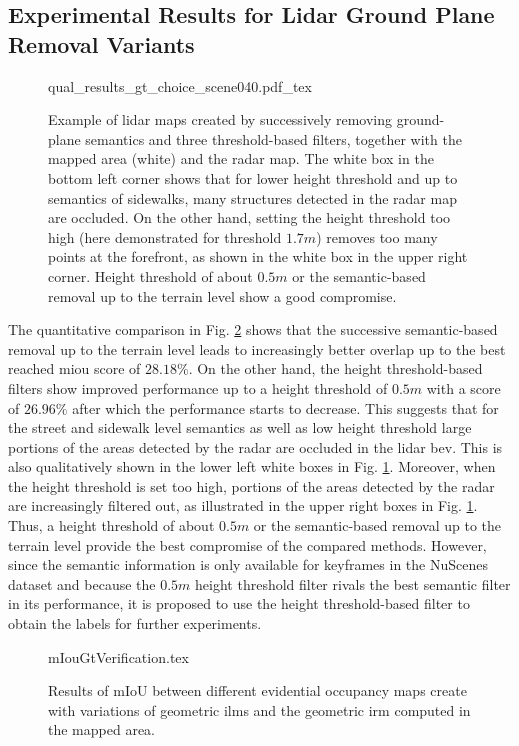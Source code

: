 \subsection{Experimental Results for Lidar Ground Plane Removal Variants}
\label{subsec:exp_results_gt}
\begin{figure}[H]
	\begin{center}
		{qual_results_gt_choice_scene040.pdf_tex}
		\caption{\label{fig:qual_results_gt_choice_scene040}Example of lidar maps created by successively removing ground-plane semantics and three threshold-based filters, together with the mapped area (white) and the radar map. The white box in the bottom left corner shows that for lower height threshold and up to semantics of sidewalks, many structures detected in the radar map are occluded. On the other hand, setting the height threshold too high (here demonstrated for threshold $1.7m$) removes too many points at the forefront, as shown in the white box in the upper right corner. Height threshold of about $0.5m$ or the semantic-based removal up to the terrain level show a good compromise.}
	\end{center}
\end{figure} 
The quantitative comparison in Fig. \ref{fig:miou_results_gt_choice} shows that the successive semantic-based removal up to the terrain level leads to increasingly better overlap up to the best reached m\gls{iou} score of $28.18\%$. On the other hand, the height threshold-based filters show improved performance up to a height threshold of $0.5m$ with a score of $26.96\%$ after which the performance starts to decrease. This suggests that for the street and sidewalk level semantics as well as low height threshold large portions of the areas detected by the radar are occluded in the lidar \gls{bev}. This is also qualitatively shown in the lower left white boxes in Fig. \ref{fig:qual_results_gt_choice_scene040}. Moreover, when the height threshold is set too high, portions of the areas detected by the radar are increasingly filtered out, as illustrated in the upper right boxes in Fig. \ref{fig:qual_results_gt_choice_scene040}. Thus, a height threshold of about $0.5m$ or the semantic-based removal up to the terrain level provide the best compromise of the compared methods. However, since the semantic information is only available for keyframes in the NuScenes dataset and because the $0.5m$ height threshold filter rivals the best semantic filter in its performance, it is proposed to use the height threshold-based filter to obtain the labels for further experiments.
\begin{figure}[htp!]
	\begin{center}
		{mIouGtVerification.tex}
		\caption{\label{fig:miou_results_gt_choice}Results of mIoU between different evidential occupancy maps create with variations of geometric \gls{ilm}s and the geometric \gls{irm} computed in the mapped area.}
	\end{center}
\end{figure}
%

